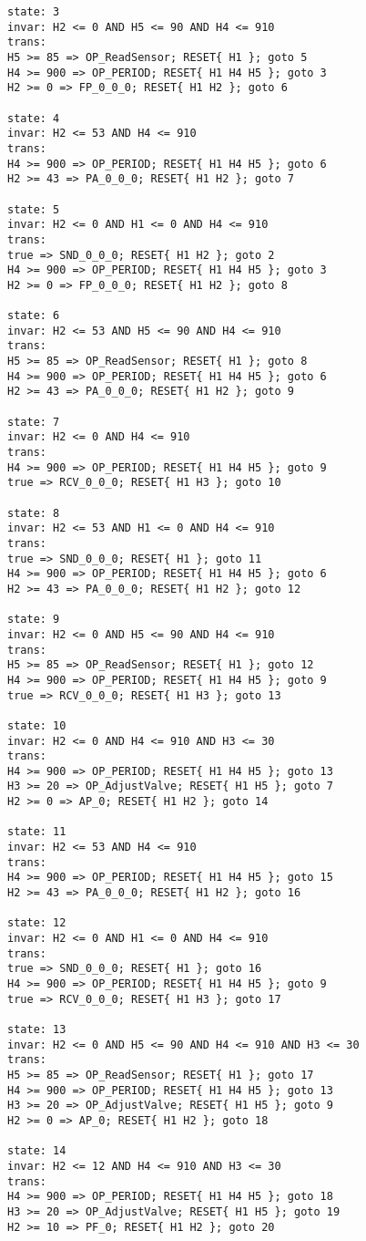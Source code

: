 {\begin{verbatim}
state: 3
invar: H2 <= 0 AND H5 <= 90 AND H4 <= 910
trans: 
H5 >= 85 => OP_ReadSensor; RESET{ H1 }; goto 5
H4 >= 900 => OP_PERIOD; RESET{ H1 H4 H5 }; goto 3
H2 >= 0 => FP_0_0_0; RESET{ H1 H2 }; goto 6

state: 4
invar: H2 <= 53 AND H4 <= 910
trans: 
H4 >= 900 => OP_PERIOD; RESET{ H1 H4 H5 }; goto 6
H2 >= 43 => PA_0_0_0; RESET{ H1 H2 }; goto 7

state: 5
invar: H2 <= 0 AND H1 <= 0 AND H4 <= 910
trans: 
true => SND_0_0_0; RESET{ H1 H2 }; goto 2
H4 >= 900 => OP_PERIOD; RESET{ H1 H4 H5 }; goto 3
H2 >= 0 => FP_0_0_0; RESET{ H1 H2 }; goto 8

state: 6
invar: H2 <= 53 AND H5 <= 90 AND H4 <= 910
trans: 
H5 >= 85 => OP_ReadSensor; RESET{ H1 }; goto 8
H4 >= 900 => OP_PERIOD; RESET{ H1 H4 H5 }; goto 6
H2 >= 43 => PA_0_0_0; RESET{ H1 H2 }; goto 9

state: 7
invar: H2 <= 0 AND H4 <= 910
trans: 
H4 >= 900 => OP_PERIOD; RESET{ H1 H4 H5 }; goto 9
true => RCV_0_0_0; RESET{ H1 H3 }; goto 10

state: 8
invar: H2 <= 53 AND H1 <= 0 AND H4 <= 910
trans: 
true => SND_0_0_0; RESET{ H1 }; goto 11
H4 >= 900 => OP_PERIOD; RESET{ H1 H4 H5 }; goto 6
H2 >= 43 => PA_0_0_0; RESET{ H1 H2 }; goto 12

state: 9
invar: H2 <= 0 AND H5 <= 90 AND H4 <= 910
trans: 
H5 >= 85 => OP_ReadSensor; RESET{ H1 }; goto 12
H4 >= 900 => OP_PERIOD; RESET{ H1 H4 H5 }; goto 9
true => RCV_0_0_0; RESET{ H1 H3 }; goto 13

state: 10
invar: H2 <= 0 AND H4 <= 910 AND H3 <= 30
trans: 
H4 >= 900 => OP_PERIOD; RESET{ H1 H4 H5 }; goto 13
H3 >= 20 => OP_AdjustValve; RESET{ H1 H5 }; goto 7
H2 >= 0 => AP_0; RESET{ H1 H2 }; goto 14

state: 11
invar: H2 <= 53 AND H4 <= 910
trans: 
H4 >= 900 => OP_PERIOD; RESET{ H1 H4 H5 }; goto 15
H2 >= 43 => PA_0_0_0; RESET{ H1 H2 }; goto 16

state: 12
invar: H2 <= 0 AND H1 <= 0 AND H4 <= 910
trans: 
true => SND_0_0_0; RESET{ H1 }; goto 16
H4 >= 900 => OP_PERIOD; RESET{ H1 H4 H5 }; goto 9
true => RCV_0_0_0; RESET{ H1 H3 }; goto 17

state: 13
invar: H2 <= 0 AND H5 <= 90 AND H4 <= 910 AND H3 <= 30
trans: 
H5 >= 85 => OP_ReadSensor; RESET{ H1 }; goto 17
H4 >= 900 => OP_PERIOD; RESET{ H1 H4 H5 }; goto 13
H3 >= 20 => OP_AdjustValve; RESET{ H1 H5 }; goto 9
H2 >= 0 => AP_0; RESET{ H1 H2 }; goto 18

state: 14
invar: H2 <= 12 AND H4 <= 910 AND H3 <= 30
trans: 
H4 >= 900 => OP_PERIOD; RESET{ H1 H4 H5 }; goto 18
H3 >= 20 => OP_AdjustValve; RESET{ H1 H5 }; goto 19
H2 >= 10 => PF_0; RESET{ H1 H2 }; goto 20


\end{verbatim}}
